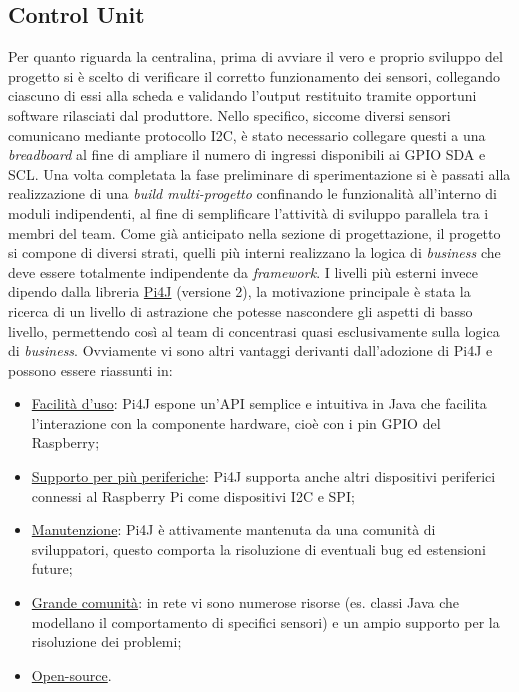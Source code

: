 \subsection{Control Unit}
Per quanto riguarda la centralina, prima di avviare il vero e proprio sviluppo del progetto si è scelto di verificare il corretto funzionamento dei sensori, collegando ciascuno di essi alla scheda e validando l'output restituito tramite opportuni software rilasciati dal produttore. Nello specifico, siccome diversi sensori comunicano mediante protocollo I2C, è stato necessario collegare questi a una \textit{breadboard} al fine di ampliare il numero di ingressi disponibili ai GPIO SDA e SCL. Una volta completata la fase preliminare di sperimentazione si è passati alla realizzazione di una \textit{build multi-progetto} confinando le funzionalità all'interno di moduli indipendenti, al fine di semplificare l'attività di sviluppo parallela tra i membri del team. Come già anticipato nella sezione di progettazione, il progetto si compone di diversi strati, quelli più interni realizzano la logica di \textit{business} che deve essere totalmente indipendente da \textit{framework}. I livelli più esterni invece dipendo dalla libreria \href{https://pi4j.com/}{Pi4J} (versione 2), la motivazione principale è stata la ricerca di un livello di astrazione che potesse nascondere gli aspetti di basso livello, permettendo così al team di concentrasi quasi esclusivamente sulla logica di \textit{business}. Ovviamente vi sono altri vantaggi derivanti dall'adozione di Pi4J e possono essere riassunti in:
\begin{itemize}
    \item \underline{Facilità d'uso}: Pi4J espone un'API semplice e intuitiva in Java che facilita l'interazione con la componente hardware, cioè con i pin GPIO del Raspberry;
    \item \underline{Supporto per più periferiche}: Pi4J supporta anche altri dispositivi periferici connessi al Raspberry Pi come dispositivi I2C e SPI;
    \item \underline{Manutenzione}: Pi4J è attivamente mantenuta da una comunità di sviluppatori, questo comporta la risoluzione di eventuali bug ed estensioni future;
    \item \underline{Grande comunità}: in rete vi sono numerose risorse (es. classi Java che modellano il comportamento di specifici sensori) e un ampio supporto per la risoluzione dei problemi;
    \item \underline{Open-source}.
\end{itemize}
